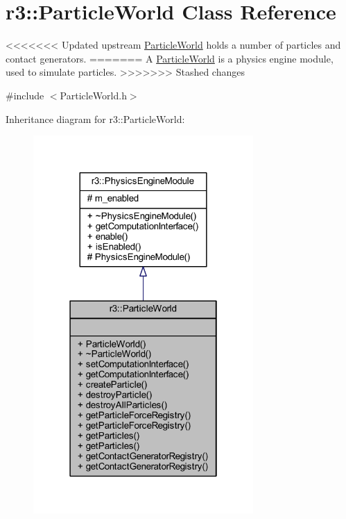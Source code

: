 \hypertarget{classr3_1_1_particle_world}{}\section{r3\+:\+:Particle\+World Class Reference}
\label{classr3_1_1_particle_world}


<<<<<<< Updated upstream
\mbox{\hyperlink{classr3_1_1_particle_world}{Particle\+World}} holds a number of particles and contact generators.  
=======
A \mbox{\hyperlink{classr3_1_1_particle_world}{Particle\+World}} is a physics engine module, used to simulate particles.  
>>>>>>> Stashed changes




{\ttfamily \#include $<$Particle\+World.\+h$>$}



Inheritance diagram for r3\+:\+:Particle\+World\+:\nopagebreak
\begin{figure}[H]
\begin{center}
\leavevmode
\includegraphics[width=238pt]{classr3_1_1_particle_world__inherit__graph}
\end{center}
\end{figure}


